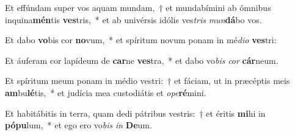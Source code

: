 \item Et effúndam super vos aquam mundam,~† et mundabímini ab ómnibus inquina\textbf{mén}tis \textbf{ves}tris,~* et ab univérsis idólis ves\textit{tris} \textit{mun}\textbf{dá}bo vos.
\item Et dabo \textbf{vo}bis cor \textbf{no}vum,~* et spíritum novum ponam in mé\textit{di}\textit{o} \textbf{ves}tri:
\item Et áuferam cor lapídeum de \textbf{car}ne \textbf{ves}tra,~* et dabo vo\textit{bis} \textit{cor} \textbf{cár}neum.
\item Et spíritum meum ponam in médio vestri:~† et fáciam, ut in præcéptis meis \textbf{am}bu\textbf{lé}tis,~* et judícia mea custodiátis et \textit{o}\textit{pe}\textbf{ré}mini.
\item Et habitábitis in terra, quam dedi pátribus vestris:~† et éritis \textbf{mi}hi in \textbf{pó}\textbf{pu}lum,~* et ego ero vo\textit{bis} \textit{in} \textbf{De}um.
